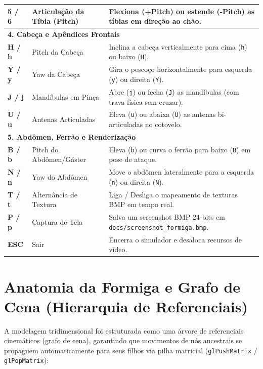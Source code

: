 \documentclass[11pt,a4paper]{article}
\begin{document}
\begin{table}[h!]
\begin{tabularx}{\textwidth}{l p{4.8cm} X}
\textbf{5 / 6} & Articulação da Tíbia (Pitch) & Flexiona (+Pitch) ou estende (-Pitch) as tíbias em direção ao chão. \\
\midrule
\multicolumn{3}{l}{\textbf{\textcolor{primary}{4. Cabeça e Apêndices Frontais}}} \\
\midrule
\textbf{H / h} & Pitch da Cabeça & Inclina a cabeça verticalmente para cima (\texttt{h}) ou baixo (\texttt{H}). \\
\textbf{Y / y} & Yaw da Cabeça & Gira o pescoço horizontalmente para esquerda (\texttt{y}) ou direita (\texttt{Y}). \\
\textbf{J / j} & Mandíbulas em Pinça & Abre (\texttt{j}) ou fecha (\texttt{J}) as mandíbulas (com trava física sem cruzar). \\
\textbf{U / u} & Antenas Articuladas & Eleva (\texttt{u}) ou abaixa (\texttt{U}) as antenas bi-articuladas no cotovelo. \\
\midrule
\multicolumn{3}{l}{\textbf{\textcolor{primary}{5. Abdômen, Ferrão e Renderização}}} \\
\midrule
\textbf{B / b} & Pitch do Abdômen/Gáster & Eleva (\texttt{b}) ou curva o ferrão para baixo (\texttt{B}) em pose de ataque. \\
\textbf{N / n} & Yaw do Abdômen & Move o abdômen lateralmente para a esquerda (\texttt{n}) ou direita (\texttt{N}). \\
\textbf{T / t} & Alternância de Textura & Liga / Desliga o mapeamento de texturas BMP em tempo real. \\
\textbf{P / p} & Captura de Tela & Salva um screenshot BMP 24-bits em \texttt{docs/screenshot\_formiga.bmp}. \\
\textbf{ESC} & Sair & Encerra o simulador e desaloca recursos de vídeo. \\
\bottomrule
\end{tabularx}
\end{table}

\section{Anatomia da Formiga e Grafo de Cena (Hierarquia de Referenciais)}

A modelagem tridimensional foi estruturada como uma árvore de referenciais cinemáticos (grafo de cena), garantindo que movimentos de nós ancestrais se propaguem automaticamente para seus filhos via pilha matricial (\texttt{glPushMatrix} / \texttt{glPopMatrix}):
\end{document}
